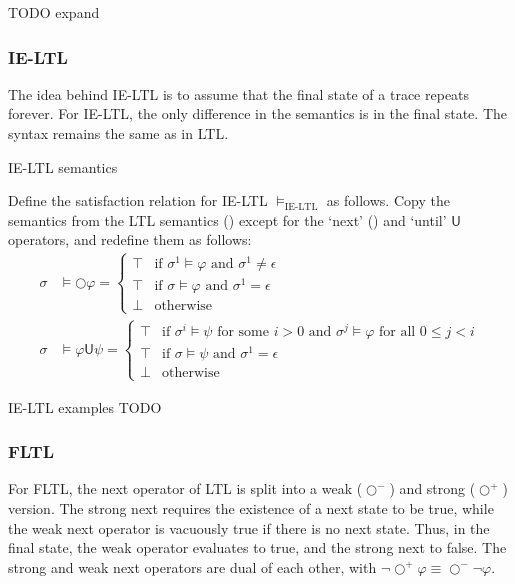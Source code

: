 \documentclass[a4paper]{article}
\newcommand{\U}{\mathsf{U}}
\newcommand{\tand}{\text{ and }}
\newcommand{\fsome}{\text{ for some }}
\newcommand{\fall}{\text{ for all }}
\newcommand{\sn}{\bigcirc^+}
\newcommand{\wn}{\bigcirc^-}
\begin{document}
TODO expand

\subsubsection{IE-LTL} The idea behind IE-LTL is to assume that the final state of a trace repeats forever. For IE-LTL, the only difference in the semantics is in the final state. The syntax remains the same as in LTL.
\begin{defn}{IE-LTL semantics}

  Define the satisfaction relation for IE-LTL $\vDash_{\text{IE-LTL}}$ as follows. Copy the semantics from the LTL semantics () except for the `next' (\bigcirc) and `until' $\U$ operators, and redefine them as follows:
  \begin{align*}
    \sigma &\vDash \bigcirc \varphi =
      \begin{cases}
        \top &\text{if } \sigma^1 \vDash \varphi \tand \sigma^1 \ne \epsilon\\
        \top &\text{if } \sigma \vDash \varphi \tand \sigma^1 = \epsilon\\
        \bot &\text{otherwise}
      \end{cases}\\
    \sigma &\vDash \varphi \U \psi =
    \begin{cases}
      \top &\text{if } \sigma^i \vDash \psi \fsome i > 0 \tand \sigma^j \vDash \varphi \fall 0 \leq j < i\\
      \top &\text{if } \sigma \vDash \psi \tand \sigma^1 = \epsilon\\
      \bot &\text{otherwise}
    \end{cases}
  \end{align*}
\end{defn}

\begin{eg}{IE-LTL examples}
  TODO
\end{eg}


\subsubsection{FLTL} For FLTL, the next operator of LTL is split into a weak ($\wn$) and strong ($\sn$) version.
The strong next requires the existence of a next state to be true, while the weak next operator is vacuously true if there is no next state.
Thus, in the final state, the weak operator evaluates to true, and the strong next to false. The strong and weak next operators are dual of each other, with  $\neg\sn\varphi \equiv \wn\neg\varphi$.
\end{document}
